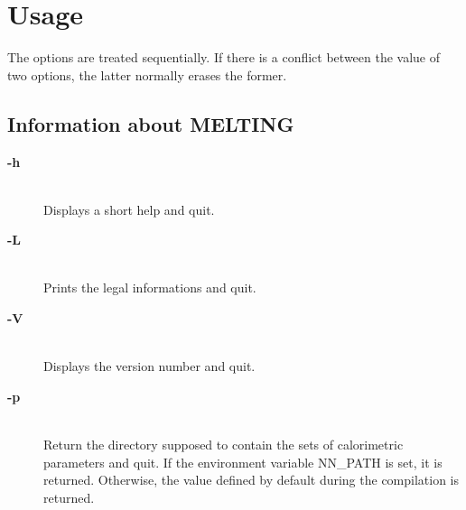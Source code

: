 \documentclass{article}
\begin{document}
\section{Usage}

The options are treated sequentially. If there is a conflict between the value
of two options, the latter normally erases the former.

\subsection{Information about MELTING}
\begin{description}

\item [\textbf{-h}]\mbox{}\\ 
  Displays a short help and quit.
\item [\textbf{-L}]\mbox{}\\ 
  Prints the legal informations and quit. 
\item [\textbf{-V}  ]\mbox{}\\ 
  Displays the version number and quit.  
\item [\textbf{-p}]\mbox{}\\ 
  Return the directory supposed to contain the sets of calorimetric parameters and quit. 
  If the environment variable NN\_PATH is set, it is returned. Otherwise, the value
  defined by default during the compilation is returned.
\end{description}
\end{document}
